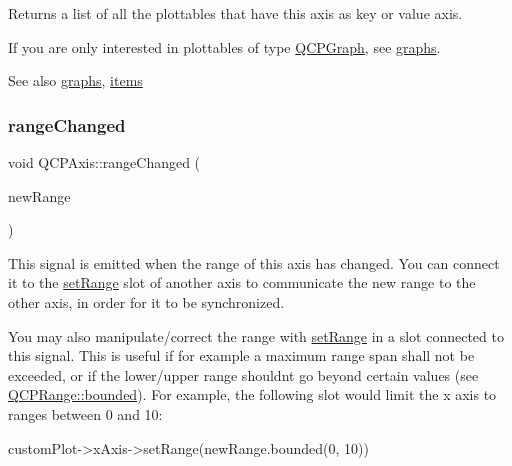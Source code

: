 Returns a list of all the plottables that have this axis as key or value axis.

If you are only interested in plottables of type \hyperlink{class_q_c_p_graph}{Q\+C\+P\+Graph}, see \hyperlink{class_q_c_p_axis_ad590c0da223697a2727f97a520870fec}{graphs}.

\begin{DoxySeeAlso}{See also}
\hyperlink{class_q_c_p_axis_ad590c0da223697a2727f97a520870fec}{graphs}, \hyperlink{class_q_c_p_axis_a42761bc68e2f3a9f68549d45b73f705b}{items} 
\end{DoxySeeAlso}
\mbox{\label{class_q_c_p_axis_a0894084e4c16a1736534c4095746f910}} 
\subsubsection{\texorpdfstring{range\+Changed}{rangeChanged}\hspace{0.1cm}{\footnotesize\ttfamily [1/2]}}
{\footnotesize\ttfamily void Q\+C\+P\+Axis\+::range\+Changed (\begin{DoxyParamCaption}\item[{const \hyperlink{class_q_c_p_range}{Q\+C\+P\+Range} \&}]{new\+Range }\end{DoxyParamCaption})\hspace{0.3cm}{\ttfamily [signal]}}

This signal is emitted when the range of this axis has changed. You can connect it to the \hyperlink{class_q_c_p_axis_aebdfea5d44c3a0ad2b4700cd4d25b641}{set\+Range} slot of another axis to communicate the new range to the other axis, in order for it to be synchronized.

You may also manipulate/correct the range with \hyperlink{class_q_c_p_axis_aebdfea5d44c3a0ad2b4700cd4d25b641}{set\+Range} in a slot connected to this signal. This is useful if for example a maximum range span shall not be exceeded, or if the lower/upper range shouldn\textquotesingle{}t go beyond certain values (see \hyperlink{class_q_c_p_range_a22151e18d961d762d25721211e89c2e5}{Q\+C\+P\+Range\+::bounded}). For example, the following slot would limit the x axis to ranges between 0 and 10\+: 
\begin{DoxyCode}
customPlot->xAxis->setRange(newRange.bounded(0, 10))
\end{DoxyCode}
 \mbox{\label{class_q_c_p_axis_aac8576288e8e31f16186124bc10dd10d}} 
